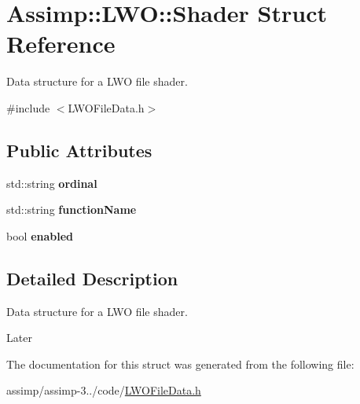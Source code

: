 \hypertarget{struct_assimp_1_1_l_w_o_1_1_shader}{\section{Assimp\+:\+:L\+W\+O\+:\+:Shader Struct Reference}
\label{struct_assimp_1_1_l_w_o_1_1_shader}
}


Data structure for a L\+W\+O file shader.  




{\ttfamily \#include $<$L\+W\+O\+File\+Data.\+h$>$}

\subsection*{Public Attributes}
\begin{DoxyCompactItemize}
\item 
\hypertarget{struct_assimp_1_1_l_w_o_1_1_shader_a7801531899f28eefa205856529e73999}{std\+::string {\bfseries ordinal}}\label{struct_assimp_1_1_l_w_o_1_1_shader_a7801531899f28eefa205856529e73999}

\item 
\hypertarget{struct_assimp_1_1_l_w_o_1_1_shader_ae4b3f3adfbe50c3322cce5688603ca44}{std\+::string {\bfseries function\+Name}}\label{struct_assimp_1_1_l_w_o_1_1_shader_ae4b3f3adfbe50c3322cce5688603ca44}

\item 
\hypertarget{struct_assimp_1_1_l_w_o_1_1_shader_a6c4f9592ea48626f19779a1f57002357}{bool {\bfseries enabled}}\label{struct_assimp_1_1_l_w_o_1_1_shader_a6c4f9592ea48626f19779a1f57002357}

\end{DoxyCompactItemize}


\subsection{Detailed Description}
Data structure for a L\+W\+O file shader. 

Later 

The documentation for this struct was generated from the following file\+:\begin{DoxyCompactItemize}
\item 
assimp/assimp-\/3../code/\hyperlink{_l_w_o_file_data_8h}{L\+W\+O\+File\+Data.\+h}\end{DoxyCompactItemize}
